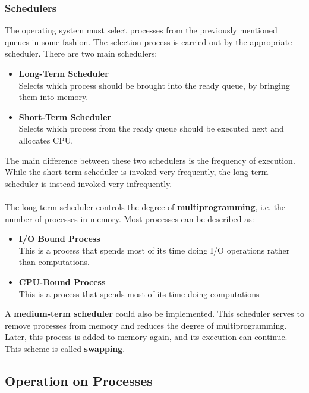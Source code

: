 \documentclass{article}
\begin{document}
\subsubsection{Schedulers}
The operating system must select processes from the previously mentioned queues in some fashion. The selection process is carried out by the appropriate scheduler. There are two main schedulers:

\begin{itemize}
	\item \textbf{Long-Term Scheduler}
	\vspace{.2cm} \\
	Selects which process should be brought into the ready queue, by bringing them into memory.
	
	\item \textbf{Short-Term Scheduler}
	\vspace{.2cm} \\
	Selects which process from the ready queue should be executed next and allocates CPU.
\end{itemize}
The main difference between these two schedulers is the frequency of execution. While the short-term scheduler is invoked very frequently, the long-term scheduler is instead invoked very infrequently. \\ \\
The long-term scheduler controls the degree of \textbf{multiprogramming}, i.e. the number of processes in memory. Most processes can be described as:

\begin{itemize}
	\item \textbf{I/O Bound Process}
	\vspace{.2cm} \\
	This is a process that spends most of its time doing I/O operations rather than computations.
	
	\item \textbf{CPU-Bound Process}
	\vspace{.2cm} \\
	This is a process that spends most of its time doing computations
\end{itemize}
A \textbf{medium-term scheduler} could also be implemented. This scheduler serves to remove processes from memory and reduces the degree of multiprogramming. Later, this process is added to memory again, and its execution can continue. This scheme is called \textbf{swapping}.

\subsection{Operation on Processes}
\end{document}
